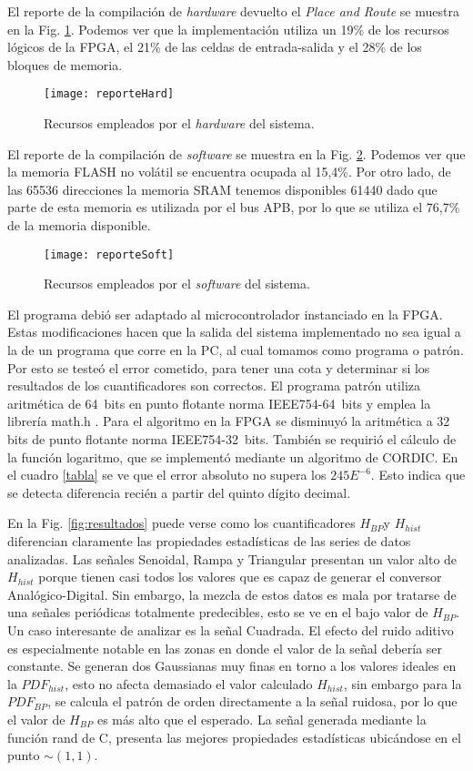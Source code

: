 El reporte de la compilación de \textit{hardware} devuelto el \textit{Place and Route} se muestra en la Fig. \ref{fig:hard}. Podemos ver que la implementación utiliza un 19\% de los recursos lógicos de la FPGA, el 21\% de las celdas de entrada-salida y el 28\% de los bloques de memoria.
%
\begin{figure}[htb]
	\centering\texttt{[image: reporteHard]}
	\caption{Recursos empleados por el \textit{hardware} del sistema.}\label{fig:hard}
\end{figure}

El reporte de la compilación de \textit{software} se muestra en la Fig. \ref{fig:soft}.
Podemos ver que la memoria FLASH no volátil se encuentra ocupada al 15,4\%.
Por otro lado, de las 65536 direcciones la memoria SRAM tenemos disponibles 61440 dado que parte de esta memoria es utilizada por el bus APB, por lo que se utiliza el 76,7\% de la memoria disponible.
%
\begin{figure}[htb]
	\centering\texttt{[image: reporteSoft]}
	\caption{Recursos empleados por el \textit{software} del sistema.}\label{fig:soft}
\end{figure}

El programa debió ser adaptado al microcontrolador instanciado en la FPGA.
Estas modificaciones hacen que la salida del sistema implementado no sea igual a la de un programa que corre en la PC, al cual tomamos como programa o patrón.
Por esto se testeó el error cometido, para tener una cota y determinar si los resultados de los cuantificadores son correctos.
El programa patrón utiliza aritmética de 64~bits en punto flotante norma IEEE754-64~bits y emplea la librería math.h \cite{Mathe}.
Para el algoritmo en la FPGA se disminuyó la aritmética a 32 bits de punto flotante norma IEEE754-32~bits.
También se requirió el cálculo de la función logaritmo, que se implementó mediante un algoritmo de CORDIC.
En el cuadro \ref{tabla} se ve que el error absoluto no supera los $245E^{-6}$. Esto indica que se detecta diferencia recién a partir del quinto dígito decimal.

En la Fig. \ref{fig:resultados} puede verse como los cuantificadores $H_{BP}$y $H_{hist}$ diferencian claramente las propiedades estadísticas de las series de datos analizadas.
Las señales Senoidal, Rampa y Triangular presentan un valor alto de $H_{hist}$ porque tienen casi todos los valores que es capaz de generar el conversor Analógico-Digital.
Sin embargo, la mezcla de estos datos es mala por tratarse de una señales periódicas totalmente predecibles, esto se ve en el bajo valor de $H_{BP}$.
Un caso interesante de analizar es la señal Cuadrada.
El efecto del ruido aditivo es especialmente notable en las zonas en donde el valor de la señal debería ser constante.
Se generan dos Gaussianas muy finas en torno a los valores ideales en la $PDF_{hist}$, esto no afecta demasiado el valor calculado $H_{hist}$, sin embargo para la $PDF_{BP}$, se calcula el patrón de orden directamente a la señal ruidosa, por lo que el valor de $H_{BP}$ es más alto que el esperado.
La señal generada mediante la función rand de C, presenta las mejores propiedades estadísticas ubicándose en el punto $\sim(1,1)$.